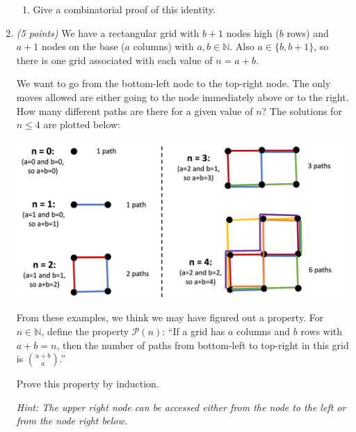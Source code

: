 \documentclass[12pt]{article}
\begin{document}
\begin{enumerate}
\begin{enumerate}

\item Give a combinatorial proof of this identity. \newline


\end{enumerate}

\item \emph{(5 points)} We have a rectangular grid with \( b+1 \) nodes high (\( b \) rows) and \( a+1 \) nodes on the base (\( a \) columns) with \( a, b \in \mathbb{N} \). Also \( a \in \{ b, b+1 \} \), so there is one grid associated with each value of \( n = a + b \). 

We want to go from the bottom-left node to the top-right node. The only moves allowed are either going to the node immediately above or to the right. 
How many different paths are there for a given value of \( n \)? The solutions for \( n \leq 4 \) are plotted below:

\includegraphics[width=\textwidth]{./qIII_paths.png} %

From these examples, we think we may have figured out a property. For \( n \in \mathbb{N} \), define the property \( \mathcal{P}(n) \): ``If a grid has \( a \) columns and \( b \) rows with \( a + b = n \), then the number of paths from bottom-left to top-right in this grid is \( \binom{a+b}{a} \).''

Prove this property by induction.

\emph{Hint: The upper right node can be accessed either from the node to the left or from the node right below.} \newline



\end{enumerate}
\newpage %
\end{document}
